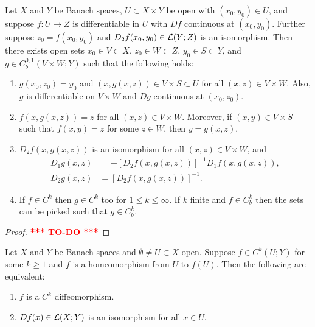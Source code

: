 \documentclass[a4paper]{article}
\newcommand{\TODO}{\textcolor{red}{\textbf{*** TO-DO ***}}}
\begin{document}
\begin{thm}
  Let $X$ and $Y$ be Banach spaces, $U \subset X \times Y$
  be open with $(x_0, y_0) \in U$, and suppose $f: U \to Z$
  is differentiable in $U$ with $Df$ continuous 
  at $(x_0, y_0)$. Further suppose $z_0 = f(x_0, y_0)$
  and $D_2 f(x_0, y_0) \in \mathcal{L}(Y; Z)$ is an isomorphism. 
  Then there exists open sets $x_0 \in V \subset X$, 
  $z_0 \in W \subset Z$, $y_0 \in S \subset Y$, and 
  $g \in C^{0,1}_b (V \times W ; Y)$ such that the following 
  holds:
  \begin{enumerate}
    \item $g(x_0, z_0) = y_0$ and $(x, g(x, z)) \in V \times S 
    \subset U$ for all $(x, z) \in V \times W$. Also, $g$ 
    is differentiable on $V \times W$ and $Dg$ continuous at 
    $(x_0, z_0)$.

    \item $f(x, g(x, z)) = z$ for all $(x, z) \in V \times W$.
    Moreover, if $(x, y) \in V \times S$ such that 
    $f(x, y) = z$ for some $z \in W$, then $y = g(x, z)$.

    \item $D_2 f(x, g(x, z))$ is an isomorphism for all 
    $(x, z) \in V \times W$, and 
    \[
    \begin{aligned}
      D_1 g(x, z) &= - \left[ D_2 f(x, g(x, z)) \right]^{-1} 
      D_1 f (x, g(x, z)), \\
      D_2 g(x, z) &= \left[ D_2 f(x, g(x, z)) \right]^{-1}.
    \end{aligned}
    \]

    \item If $f \in C^k$ then $g \in C^k$ too for $1 \leq k 
    \leq \infty$. If $k$ finite and $f \in C^k_b$ then the 
    sets can be picked such that $g \in C^k_b$.
  \end{enumerate}
\end{thm}

\begin{proof}
  \TODO
\end{proof}


\begin{thm}
Let $X$ and $Y$ be Banach spaces and $\emptyset \neq U \subset X$
open.  Suppose $f \in C^k(U; Y)$ for some $k \geq 1$ and 
$f$ is a homeomorphism from $U$ to $f(U)$. Then the following
are equivalent: 
\begin{enumerate}
\item $f$ is a $C^k$ diffeomorphism.
\item $Df(x) \in \mathcal{L}(X; Y)$ is an isomorphism for all $x \in U$.
\end{enumerate}
\end{thm}
\end{document}
